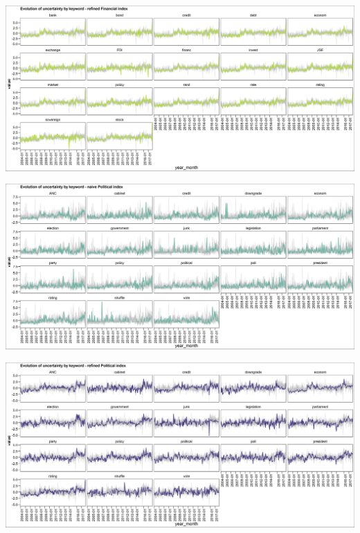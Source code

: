 \documentclass[11pt,preprint, authoryear]{elsarticle}
\let\origfigure\figure
\let\endorigfigure\endfigure
\renewenvironment{figure}[1][2] {
    \expandafter\origfigure\expandafter[H]
} {
    \endorigfigure
}
\numberwithin{equation}{section}
\numberwithin{figure}{section}
\numberwithin{table}{section}
\begin{document}
\begin{figure}
	\centering
	\includegraphics[width=\linewidth, keepaspectratio]{bin/financial_key_refine}\\
	
	\caption{Composite Financial market uncertainty refined index. \label{fig_fin_key_r}}
\end{figure}

\begin{figure}
	\centering
	\includegraphics[width=\linewidth, keepaspectratio]{bin/pol_key_naive}\\
	
	\caption{Composite Political uncertainty naive index. \label{fig_pol_key_n}}
\end{figure}

\begin{figure}
	\centering
	\includegraphics[width=\linewidth, keepaspectratio]{bin/pol_key_refine}\\
	\caption{Composite Political uncertainty refined index. \label{fig_pol_key_r}}
\end{figure}
\end{document}
